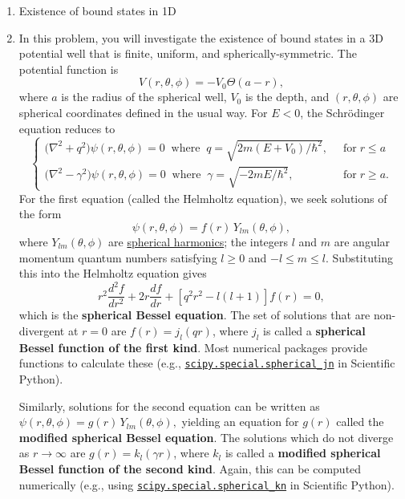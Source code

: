\documentclass[pra,12pt]{revtex4}
\begin{document}
\begin{enumerate}
\item Existence of bound states in 1D
\label{ex:boundstate}

\item In this problem, you will investigate the existence of bound
  states in a 3D potential well that is finite, uniform, and
  spherically-symmetric.  The potential function is
$$V(r,\theta,\phi) = -V_0\Theta(a-r),$$
  where $a$ is the radius of the spherical well, $V_0$ is the depth,
  and $(r,\theta,\phi)$ are spherical coordinates defined in the usual
  way.  For $E < 0$, the Schr\"odinger equation reduces to
$$\begin{cases}\Big(\nabla^2 + q^2\Big) \psi(r,\theta,\phi) = 0 \;\;\mathrm{where}\;\; q = \sqrt{2m(E+V_0)/\hbar^2}, \;\;&\mathrm{for} \; r \le a \\ \Big(\nabla^2 - \gamma^2\Big) \psi(r,\theta,\phi) = 0 \;\;\mathrm{where}\;\; \gamma = \sqrt{-2mE/\hbar^2}, \;\;&\mathrm{for} \; r \ge a. \end{cases}$$
  For the first equation (called the Helmholtz equation), we seek
  solutions of the form
  $$\psi(r,\theta,\phi) = f(r) \, Y_{lm}(\theta,\phi),$$
  where $Y_{lm}(\theta,\phi)$ are
  \href{https://en.wikipedia.org/wiki/Spherical_harmonics}{spherical
    harmonics}; the integers $l$ and $m$ are angular momentum
  quantum numbers satisfying $l \ge 0$ and $-l \le m \le l$.
  Substituting this into the Helmholtz equation gives
  $$r^2\frac{d^2f}{dr^2} + 2r \frac{df}{dr}+\left[q^2r^2-l(l+1)\right] f(r) = 0,$$
  which is the \textbf{spherical Bessel equation}.  The set of
  solutions that are non-divergent at $r = 0$ are $f(r) = j_l(qr)$,
  where $j_l$ is called a \textbf{spherical Bessel function of the
    first kind}.  Most numerical packages provide functions to
  calculate these (e.g.,
  \href{https://docs.scipy.org/doc/scipy/reference/generated/scipy.special.spherical_jn.html}{\texttt{scipy.special.spherical\_jn}}
  in Scientific Python).

  Similarly, solutions for the second equation can be written as
  $\psi(r,\theta,\phi) = g(r) \, Y_{lm}(\theta,\phi),$ yielding an
  equation for $g(r)$ called the \textbf{modified spherical Bessel
    equation}.  The solutions which do not diverge as $r\rightarrow
  \infty$ are $g(r) = k_l(\gamma r)$, where $k_l$ is called a
  \textbf{modified spherical Bessel function of the second kind}.
  Again, this can be computed numerically (e.g., using
  \href{https://docs.scipy.org/doc/scipy/reference/generated/scipy.special.spherical_kn.html#scipy.special.spherical_kn}{\texttt{scipy.special.spherical\_kn}}
  in Scientific Python).


\end{enumerate}
\end{document}
